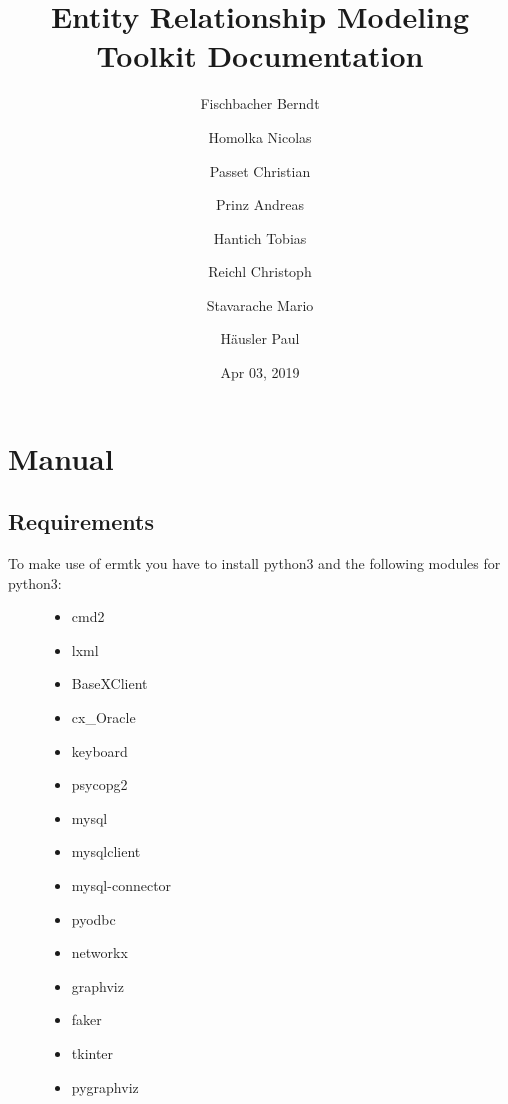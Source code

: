 \documentclass[letterpaper,10pt,english,openany,oneside]{sphinxmanual}
\title{Entity Relationship Modeling Toolkit Documentation}
\date{Apr 03, 2019}
\author{
  Fischbacher Berndt
  \and
  Homolka Nicolas
  \and
  Passet Christian
  \and
  Prinz Andreas
  \and
  Hantich Tobias
  \and
  Reichl Christoph
  \and
  Stavarache Mario
  \and
  Häusler Paul
}
\begin{document}
\pagestyle{empty}
\sphinxmaketitle
\pagestyle{plain}
\sphinxtableofcontents
\pagestyle{normal}
\label{\detokenize{index::doc}}



\chapter{Manual}
\label{\detokenize{install:manual}}\label{\detokenize{install::doc}}

\section{Requirements}
\label{\detokenize{install:requirements}}\begin{description}
\item[{To make use of ermtk you have to install python3 and the following modules for python3:}] \leavevmode\begin{itemize}
\item {} 
cmd2

\item {} 
lxml

\item {} 
BaseXClient

\item {} 
cx\_Oracle

\item {} 
keyboard

\item {} 
psycopg2

\item {} 
mysql

\item {} 
mysqlclient

\item {} 
mysql-connector

\item {} 
pyodbc

\item {} 
networkx

\item {} 
graphviz

\item {} 
faker

\item {} 
tkinter

\item {} 
pygraphviz

\end{itemize}

\end{description}
\end{document}
